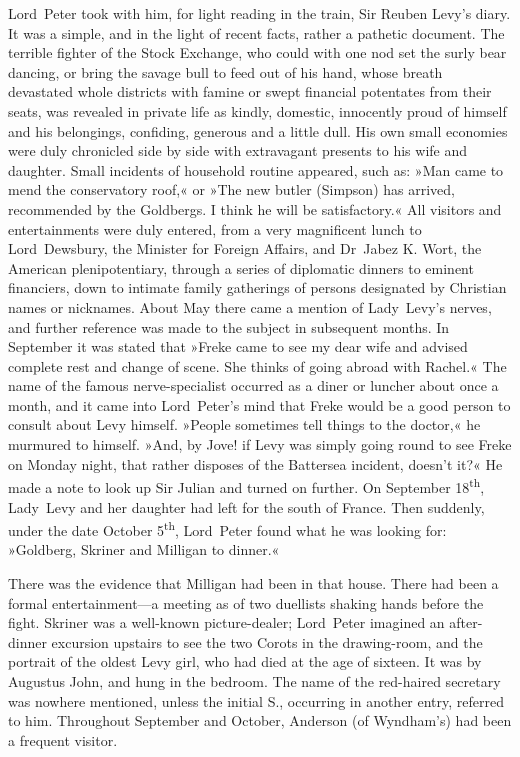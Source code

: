 Lord~Peter took with him, for light reading in the train, Sir Reuben Levy's diary. It was a simple, and in the light of recent facts, rather a pathetic document. The terrible fighter of the Stock Exchange, who could with one nod set the surly bear dancing, or bring the savage bull to feed out of his hand, whose breath devastated whole districts with famine or swept financial potentates from their seats, was revealed in private life as kindly, domestic, innocently proud of himself and his belongings, confiding, generous and a little dull. His own small economies were duly chronicled side by side with extravagant presents to his wife and daughter. Small incidents of household routine appeared, such as: »Man came to mend the conservatory roof,« or »The new butler (Simpson) has arrived, recommended by the Goldbergs. I think he will be satisfactory.« All visitors and entertainments were duly entered, from a very magnificent lunch to Lord~Dewsbury, the Minister for Foreign Affairs, and Dr~Jabez K. Wort, the American plenipotentiary, through a series of diplomatic dinners to eminent financiers, down to intimate family gatherings of persons designated by Christian names or nicknames. About May there came a mention of Lady~Levy's nerves, and further reference was made to the subject in subsequent months. In September it was stated that »Freke came to see my dear wife and advised complete rest and change of scene. She thinks of going abroad with Rachel.« The name of the famous nerve-specialist occurred as a diner or luncher about once a month, and it came into Lord~Peter's mind that Freke would be a good person to consult about Levy himself. »People sometimes tell things to the doctor,« he murmured to himself. »And, by Jove! if Levy was simply going round to see Freke on Monday night, that rather disposes of the Battersea incident, doesn't it?« He made a note to look up Sir Julian and turned on further. On September 18\textsuperscript{th}, Lady~Levy and her daughter had left for the south of France. Then suddenly, under the date October 5\textsuperscript{th}, Lord~Peter found what he was looking for: »Goldberg, Skriner and Milligan to dinner.«

There was the evidence that Milligan had been in that house. There had been a formal entertainment—a meeting as of two duellists shaking hands before the fight. Skriner was a well-known picture-dealer; Lord~Peter imagined an after-dinner excursion upstairs to see the two Corots in the drawing-room, and the portrait of the oldest Levy girl, who had died at the age of sixteen. It was by Augustus John, and hung in the bedroom. The name of the red-haired secretary was nowhere mentioned, unless the initial S., occurring in another entry, referred to him. Throughout September and October, Anderson (of Wyndham's) had been a frequent visitor.


